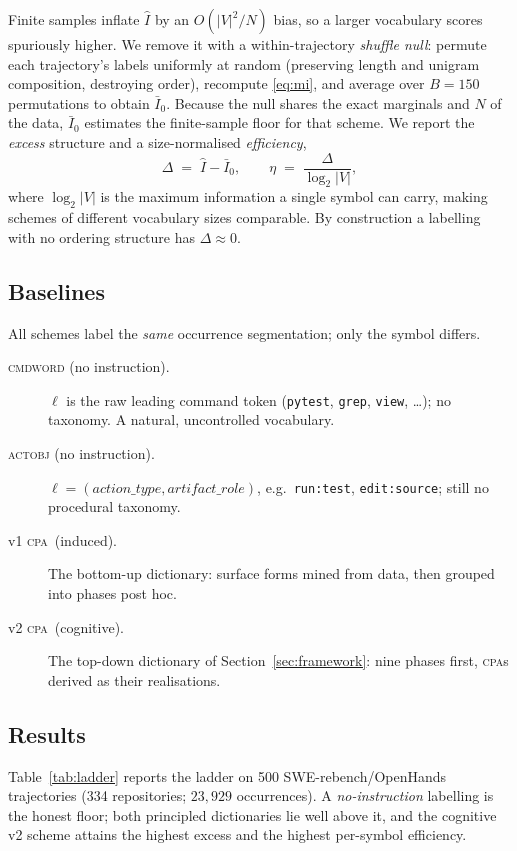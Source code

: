 \documentclass[11pt]{article}
\newcommand{\cpa}{\textsc{cpa}}
\begin{document}
Finite samples inflate $\hat I$ by an $O(|V|^2/N)$ bias, so a larger vocabulary scores
spuriously higher. We remove it with a within-trajectory \emph{shuffle null}: permute each
trajectory's labels uniformly at random (preserving length and unigram composition, destroying
order), recompute \eqref{eq:mi}, and average over $B=150$ permutations to obtain $\bar{I}_0$.
Because the null shares the exact marginals and $N$ of the data, $\bar I_0$ estimates the
finite-sample floor for that scheme. We report the \emph{excess} structure and a
size-normalised \emph{efficiency},
\begin{equation}
\Delta \;=\; \hat{I}-\bar{I}_0 ,
\qquad
\eta \;=\; \frac{\Delta}{\log_2 |V|},
\label{eq:excess}
\end{equation}
where $\log_2|V|$ is the maximum information a single symbol can carry, making schemes of
different vocabulary sizes comparable. By construction a labelling with no ordering structure
has $\Delta\approx 0$.

\subsection{Baselines}
All schemes label the \emph{same} occurrence segmentation; only the symbol differs.
\begin{description}
  \item[\textsc{cmdword} (no instruction).] $\ell$ is the raw leading command token
        (\texttt{pytest}, \texttt{grep}, \texttt{view}, \dots); no taxonomy. A natural,
        uncontrolled vocabulary.
  \item[\textsc{actobj} (no instruction).] $\ell=(\textit{action\_type},\textit{artifact\_role})$,
        e.g.\ \texttt{run:test}, \texttt{edit:source}; still no procedural taxonomy.
  \item[v1 \cpa\ (induced).] The bottom-up dictionary: surface forms mined from data, then
        grouped into phases post hoc.
  \item[v2 \cpa\ (cognitive).] The top-down dictionary of Section~\ref{sec:framework}: nine
        phases first, \cpa s derived as their realisations.
\end{description}

\subsection{Results}
Table~\ref{tab:ladder} reports the ladder on 500 SWE-rebench/OpenHands trajectories
(334 repositories; $23{,}929$ occurrences). A \emph{no-instruction} labelling is the honest
floor; both principled dictionaries lie well above it, and the cognitive v2 scheme attains the
highest excess and the highest per-symbol efficiency.
\end{document}
